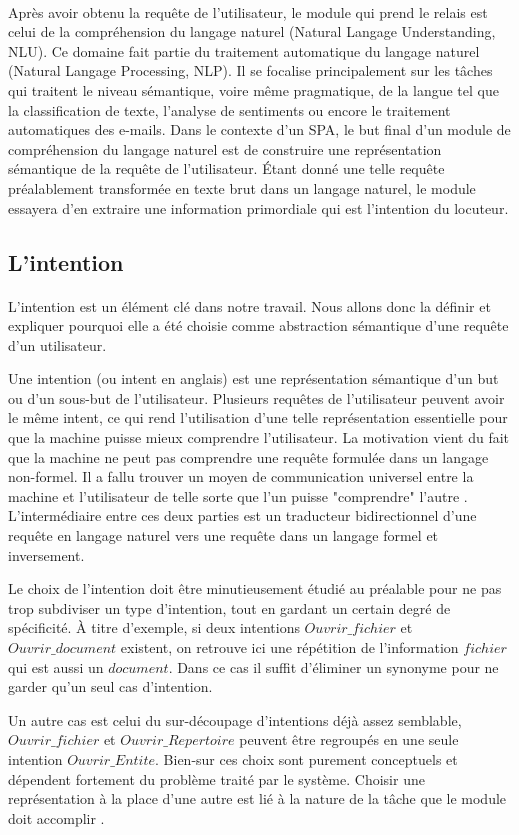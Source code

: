 \paragraph{}
\label{nlu_chap2}
Après avoir obtenu la requête de l'utilisateur, le module qui prend le relais est celui de la compréhension du langage naturel (Natural Langage Understanding, NLU). Ce domaine fait partie du traitement automatique du langage naturel (Natural Langage Processing, NLP). Il se focalise principalement sur les tâches qui traitent le niveau sémantique, voire même pragmatique, de la langue tel que la classification de texte, l'analyse de sentiments ou encore le traitement automatiques des e-mails. Dans le contexte d'un SPA, le but final d'un module de compréhension du langage naturel est de construire une représentation sémantique de la requête de l'utilisateur. Étant donné une telle requête préalablement transformée en texte brut dans un langage naturel, le module essayera d'en extraire une information primordiale qui est l'intention du locuteur.

\subsection{L'intention}
\paragraph{}
L'intention est un élément clé dans notre travail. Nous allons donc la définir et expliquer pourquoi elle a été choisie comme abstraction sémantique d'une requête d'un utilisateur. \par

Une intention (ou intent en anglais) est une représentation sémantique d'un but ou d'un sous-but de l'utilisateur. Plusieurs requêtes de l'utilisateur peuvent avoir le même intent, ce qui rend l'utilisation d'une telle représentation essentielle pour que la machine puisse mieux comprendre l'utilisateur. La motivation vient du fait que la machine ne peut pas comprendre une requête formulée dans un langage non-formel. Il a fallu trouver un moyen de communication universel entre la machine et l'utilisateur de telle sorte que l'un puisse "comprendre" l'autre . L'intermédiaire entre ces deux parties est un traducteur bidirectionnel d'une requête en langage naturel vers une requête dans un langage formel et inversement. 
\par Le choix de l'intention doit être minutieusement étudié au préalable pour ne pas trop subdiviser un type d'intention, tout en gardant un certain degré de spécificité. À titre d'exemple, si deux intentions $Ouvrir\_fichier$ et $Ouvrir\_document$ existent, on retrouve ici une répétition de l'information $fichier$ qui est aussi un $document$. Dans ce cas il suffit d'éliminer un synonyme pour ne garder qu'un seul cas d'intention. \par
Un autre cas est celui du sur-découpage d'intentions déjà assez semblable, $Ouvrir\_fichier$ et $Ouvrir\_Repertoire$ peuvent être regroupés en une seule intention $Ouvrir\_Entite$. Bien-sur ces choix sont purement conceptuels et dépendent fortement du problème traité par le système. Choisir une représentation à la place d'une autre est lié à la nature de la tâche que le module doit accomplir \citep{intent_classification,intent_slots}.
